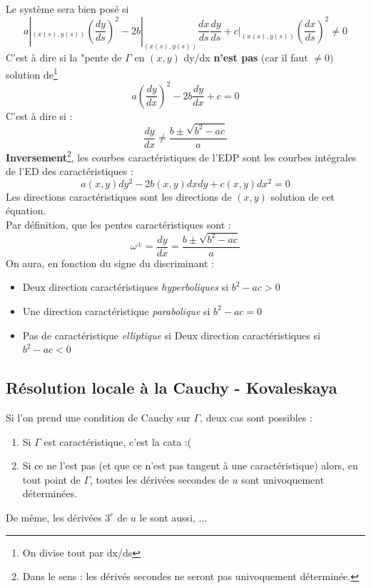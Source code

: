 \documentclass	[11pt, a4paper, openany]{book}
\begin{document}
				Le système sera bien posé si
				\begin{equation}
					a|_{(x(s),y(s))} \left(\dfrac{dy}{ds}\right)^2 - 2b|_{(x(s),y(s))} \dfrac{dx}{ds}\dfrac{dy}{ds} + c|_{(x(s),y(s))}\left(\dfrac{dx}{ds}\right)^2 \neq 0
				\end{equation}
				C'est à dire si la "pente de $\Gamma$ en $(x,y)$ dy/dx \textbf{n'est pas} (car il faut $\neq 0)$ solution de\footnote{On divise tout par dx/ds}
				\begin{equation}
					a\left(\dfrac{dy}{dx}\right)^2 - 2b\dfrac{dy}{dx} + c = 0
				\end{equation}
				C'est à dire si :
				\begin{equation}
					\dfrac{dy}{dx} \neq \dfrac{b\pm \sqrt{b^2-ac}}{a}
				\end{equation}
				\textbf{Inversement}\footnote{Dans le sens : les dérivés secondes ne seront pas univoquement déterminée.}, les courbes caractéristiques de l'EDP sont les courbes intégrales de l'ED des caractéristiques :
				\begin{equation}
					a(x,y)dy^2 - 2b(x,y)dxdy + c(x,y)dx^2 = 0
				\end{equation}
				Les directions caractéristiques sont les directions de $(x,y)$ solution de cet équation.\\Par définition, que les pentes caractéristiques sont :
				\begin{equation}
					\omega^\pm = \dfrac{dy}{dx} = \dfrac{b\pm \sqrt{b^2-ac}}{a}
				\end{equation}
				On aura, en fonction du signe du discriminant :
				\begin{itemize}
					\item Deux direction caractéristiques \textit{hyperboliques} si $b^2-ac > 0$
					\item Une direction caractéristique \textit{parabolique} si $b^2-ac = 0$
					\item Pas de caractéristique \textit{elliptique} si Deux direction caractéristiques si $b^2-ac < 0$
				\end{itemize}
				
				\subsection{Résolution locale à la Cauchy - Kovaleskaya}
				Si l'on prend une condition de Cauchy sur $\Gamma$, deux cas sont possibles :
				\begin{enumerate}
					\item Si $\Gamma$ est caractéristique, c'est la cata :(
					\item Si ce ne l'est pas (et que ce n'est pas tangent à une caractéristique) alors, en tout point de $\Gamma$, toutes les dérivées secondes de $u$ sont univoquement déterminées.
				\end{enumerate}
				De même, les dérivées $3^e$ de $u$ le sont aussi, $\dots$\\
				
\end{document}

